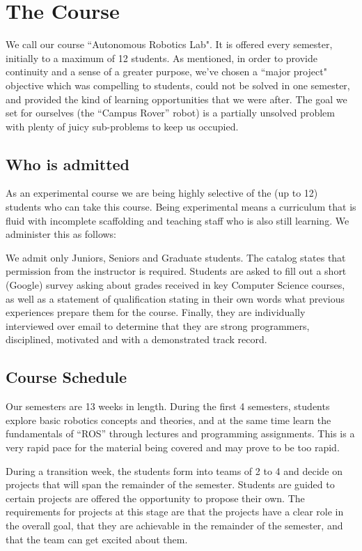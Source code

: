 \section{The Course}

We call our course ``Autonomous Robotics Lab". It is offered every semester, initially to a maximum of 12 students. As mentioned, in order to provide continuity and a sense of a greater purpose, we've chosen a ``major project" objective which was compelling to students, could not be solved in one semester, and provided the kind of learning opportunities that we were after. The goal we set for ourselves (the ``Campus Rover'' robot) is a partially unsolved problem with plenty of juicy sub-problems to keep us occupied.

\subsection{Who is admitted} As an experimental course we are being highly selective of the (up to 12) students who can take this course. Being experimental means a curriculum that is fluid with incomplete scaffolding and teaching staff who is also still learning. We administer this as follows:

We admit only Juniors, Seniors and Graduate students. The catalog states that permission from the instructor is required. Students are asked to fill out a short (Google) survey asking about grades received in key Computer Science courses, as well as a statement of qualification stating in their own words what previous experiences prepare them for the course. Finally, they are individually interviewed over email to determine that they are strong programmers, disciplined, motivated and with a demonstrated track record.

\subsection{Course Schedule} Our semesters are 13 weeks in length. During the first 4 semesters, students explore basic robotics concepts and theories, and at the same time learn the fundamentals of ``ROS'' through lectures and programming assignments. This is a very rapid pace for the material being covered and may prove to be too rapid. 

During a transition week, the students form into teams of 2 to 4 and decide on projects that will span the remainder of the semester. Students are guided to certain projects are offered the opportunity to propose their own. The  requirements for projects at this stage are that the projects have a clear role in the overall goal, that they are achievable in the remainder of the semester, and that the team can get excited about them.

